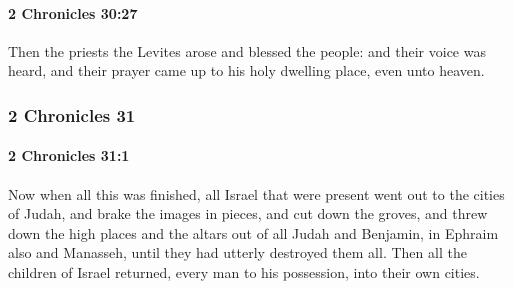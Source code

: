 		\paragraph{2 Chronicles 30:27} %
			\label{2CHRONICLES-30-27}

			Then the priests the Levites arose and blessed the people: and their voice was heard, and their prayer came up to his holy dwelling place, even unto heaven.

	\subsubsection{2 Chronicles 31} %
		\label{2CHRONICLES-31}

		\paragraph{2 Chronicles 31:1} %
			\label{2CHRONICLES-31-1}

			Now when all this was finished, all Israel that were present went out to the cities of Judah, and brake the images in pieces, and cut down the groves, and threw down the high places and the altars out of all Judah and Benjamin, in Ephraim also and Manasseh, until they had utterly destroyed them all. Then all the children of Israel returned, every man to his possession, into their own cities.

